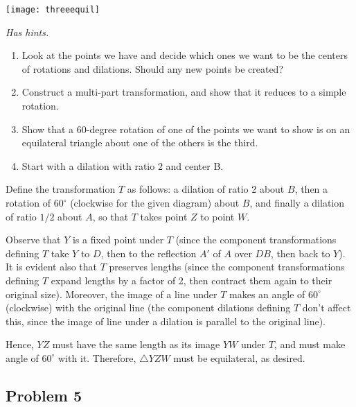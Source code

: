 
\begin{center}
\texttt{[image: threeequil]}
\end{center}
\textit{Has hints.}
\begin{sketch}
    \begin{enumerate}
        \item Look at the points we have and decide which ones we want to be the centers of rotations and dilations. Should any new points be created?
        \item Construct a multi-part transformation, and show that it reduces to a simple rotation.
        \item Show that a 60-degree rotation of one of the points we want to show is on an equilateral triangle about one of the others is the third.
        \item Start with a dilation with ratio 2 and center B.
    \end{enumerate}
\end{sketch}


\begin{mdsoln}
Define the transformation $ T$ as follows: a dilation of ratio 2 about $ B$, then a rotation of $ 60^\circ$ (clockwise for the given diagram) about $ B$, and finally a dilation of ratio $ 1/2$ about $ A$, so that $ T$ takes point $ Z$ to point $ W$.

Observe that $ Y$ is a fixed point under $ T$ (since the component transformations defining $ T$ take $ Y$ to $ D$, then to the reflection $ A'$ of $ A$ over $ DB$, then back to $ Y$). It is evident also that $ T$ preserves lengths (since the component transformations defining $ T$ expand lengths by a factor of 2, then contract them again to their original size). Moreover, the image of a line under $ T$ makes an angle of $ 60^\circ$ (clockwise) with the original line (the component dilations defining $ T$ don’t affect this, since the image of line under a dilation is parallel to the original line).

Hence, $ YZ$ must have the same length as its image $ YW$ under $ T$, and must make angle of $ 60^\circ$ with it. Therefore, $ \triangle YZW$ must be equilateral, as desired.
    
\end{mdsoln}

\subsection{Problem 5}

